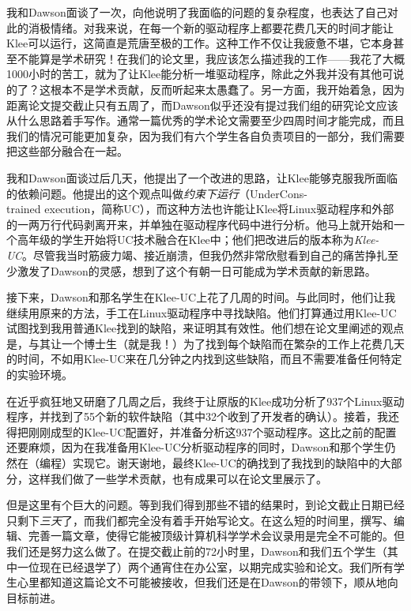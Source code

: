 \documentclass[letter,12pt]{book}
\begin{document}
\begin{CJK}{UTF8}{gbsn}
我和Dawson面谈了一次，向他说明了我面临的问题的复杂程度，也表达了自己对此的消极情绪。对我来说，在每一个新的驱动程序上都要花费几天的时间才能让Klee可以运行，这简直是荒唐至极的工作。这种工作不仅让我疲惫不堪，它本身甚至不能算是学术研究！在我们的论文里，我应该怎么描述我的工作——我花了大概1000小时的苦工，就为了让Klee能分析一堆驱动程序，除此之外我并没有其他可说的了？这根本不是学术贡献，反而听起来太愚蠢了。另一方面，我开始着急，因为距离论文提交截止只有五周了，而Dawson似乎还没有提过我们组的研究论文应该从什么思路着手写作。通常一篇优秀的学术论文需要至少四周时间才能完成，而且我们的情况可能更加复杂，因为我们有六个学生各自负责项目的一部分，我们需要把这些部分融合在一起。

我和Dawson面谈过后几天，他提出了一个改进的思路，让Klee能够克服我所面临的依赖问题。他提出的这个观点叫做\emph{约束下运行}（UnderCons-\\trained execution，简称UC），而这种方法也许能让Klee将Linux驱动程序和外部的一两万行代码剥离开来，并单独在驱动程序代码中进行分析。他马上就开始和一个高年级的学生开始将UC技术融合在Klee中；他们把改进后的版本称为\emph{Klee-UC}。尽管我当时筋疲力竭、接近崩溃，但我仍然非常欣慰看到自己的痛苦挣扎至少激发了Dawson的灵感，想到了这个有朝一日可能成为学术贡献的新思路。

接下来，Dawson和那名学生在Klee-UC上花了几周的时间。与此同时，他们让我继续用原来的方法，手工在Linux驱动程序中寻找缺陷。他们打算通过用Klee-UC试图找到我用普通Klee找到的缺陷，来证明其有效性。他们想在论文里阐述的观点是，与其让一个博士生（就是我！）为了找到每个缺陷而在繁杂的工作上花费几天的时间，不如用Klee-UC来在几分钟之内找到这些缺陷，而且不需要准备任何特定的实验环境。

在近乎疯狂地又研磨了几周之后，我终于让原版的Klee成功分析了937个Linux驱动程序，并找到了55个新的软件缺陷（其中32个收到了开发者的确认）。接着，我还得把刚刚成型的Klee-UC配置好，并准备分析这937个驱动程序。这比之前的配置还要麻烦，因为在我准备用Klee-UC分析驱动程序的同时，Dawson和那个学生仍然在（编程）实现它。谢天谢地，最终Klee-UC的确找到了我找到的缺陷中的大部分，这样我们做了一些学术贡献，也有成果可以在论文里展示了。

但是这里有个巨大的问题。等到我们得到那些不错的结果时，到论文截止日期已经只剩下\emph{三天}了，而我们都完全没有着手开始写论文。在这么短的时间里，撰写、编辑、完善一篇文章，使得它能被顶级计算机科学学术会议录用是完全不可能的。但我们还是努力这么做了。在提交截止前的72小时里，Dawson和我们五个学生（其中一位现在已经退学了）两个通宵住在办公室，以期完成实验和论文。我们所有学生心里都知道这篇论文不可能被接收，但我们还是在Dawson的带领下，顺从地向目标前进。


\end{CJK}
\end{document}
